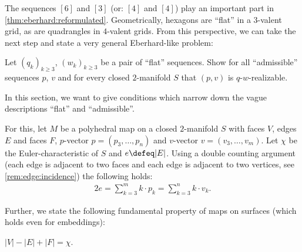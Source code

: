 The sequences $[6]$ and $[3]$ (or: $[4]$ and $[4]$) play an important part in \autoref{thm:eberhard:reformulated}. Geometrically, hexagons are ``flat'' in a $3$-valent grid, as are quadrangles in $4$-valent grids. From this perspective, we can take the next step and state a very general {\sc Eberhard}-like problem:

\begin{problem}\label{prob:eberhard:unspecified}
  Let $(q_k)_{k \geq 3}$, $(w_k)_{k \geq 3}$ be a pair of ``flat'' sequences. Show for all ``admissible'' sequences $p$, $v$ and for every closed $2$-manifold $S$ that $(p, v)$ is $q$-$w$-realizable.
\end{problem}

In this section, we want to give conditions which narrow down the vague descriptions ``flat'' and ``admissible''. 

For this, let $M$ be a polyhedral map on a closed $2$-manifold $S$ with faces $V$, edges $E$ and faces $F$, $p$-vector $p = (p_3, \dots, p_n)$ and $v$-vector $v = (v_3, \dots, v_m)$. Let $\chi$ be the {\sc Euler}-characteristic of $S$ and $e \defeq |E|$. Using a double counting argument (each edge is adjacent to two faces and each edge is adjacent to two vertices, see \autoref{rem:edge:incidence}) the following holds:
\begin{align}
  2e = \sum_{k=3}^{m} k \cdot p_k = \sum_{k=3}^{n} k \cdot v_k \label{eq:handshake}.
\end{align}

Further, we state the following fundamental property of maps on surfaces (which holds even for embeddings):
\begin{theorem}\label{thm:eulers:relation} $|V| - |E| + |F| = \chi$.
\end{theorem}

